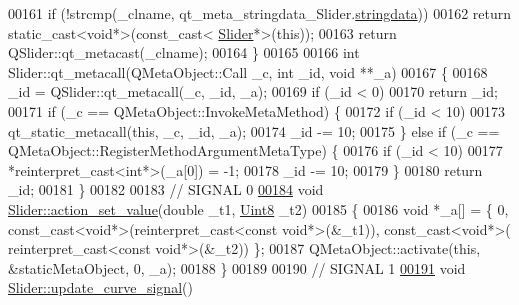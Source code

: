 \begin{DoxyCode}
00161     \textcolor{keywordflow}{if} (!strcmp(\_clname, qt\_meta\_stringdata\_Slider.\hyperlink{a00019_aa9f32a65077d2d4f1c99ac3536a308da}{stringdata}))
00162         \textcolor{keywordflow}{return} \textcolor{keyword}{static\_cast<}\textcolor{keywordtype}{void}*\textcolor{keyword}{>}(\textcolor{keyword}{const\_cast<} \hyperlink{a00024}{Slider}*\textcolor{keyword}{>}(\textcolor{keyword}{this}));
00163     \textcolor{keywordflow}{return} QSlider::qt\_metacast(\_clname);
00164 \}
00165 
00166 \textcolor{keywordtype}{int} Slider::qt\_metacall(QMetaObject::Call \_c, \textcolor{keywordtype}{int} \_id, \textcolor{keywordtype}{void} **\_a)
00167 \{
00168     \_id = QSlider::qt\_metacall(\_c, \_id, \_a);
00169     \textcolor{keywordflow}{if} (\_id < 0)
00170         \textcolor{keywordflow}{return} \_id;
00171     \textcolor{keywordflow}{if} (\_c == QMetaObject::InvokeMetaMethod) \{
00172         \textcolor{keywordflow}{if} (\_id < 10)
00173             qt\_static\_metacall(\textcolor{keyword}{this}, \_c, \_id, \_a);
00174         \_id -= 10;
00175     \} \textcolor{keywordflow}{else} \textcolor{keywordflow}{if} (\_c == QMetaObject::RegisterMethodArgumentMetaType) \{
00176         \textcolor{keywordflow}{if} (\_id < 10)
00177             *\textcolor{keyword}{reinterpret\_cast<}\textcolor{keywordtype}{int}*\textcolor{keyword}{>}(\_a[0]) = -1;
00178         \_id -= 10;
00179     \}
00180     \textcolor{keywordflow}{return} \_id;
00181 \}
00182 
00183 \textcolor{comment}{// SIGNAL 0}
\hypertarget{a00019_source_l00184}{}\hyperlink{a00024_a886f07f2c612121bec703581f9398a10}{00184} \textcolor{keywordtype}{void} \hyperlink{a00024_a886f07f2c612121bec703581f9398a10}{Slider::action\_set\_value}(\textcolor{keywordtype}{double} \_t1, \hyperlink{a00001_a979e3e23b9a449e69ab6a8a83b6042f8}{Uint8} \_t2)
00185 \{
00186     \textcolor{keywordtype}{void} *\_a[] = \{ 0, \textcolor{keyword}{const\_cast<}\textcolor{keywordtype}{void}*\textcolor{keyword}{>}(\textcolor{keyword}{reinterpret\_cast<}\textcolor{keyword}{const }\textcolor{keywordtype}{void}*\textcolor{keyword}{>}(&\_t1)), \textcolor{keyword}{const\_cast<}\textcolor{keywordtype}{void}*\textcolor{keyword}{>}(\textcolor{keyword}{
      reinterpret\_cast<}\textcolor{keyword}{const }\textcolor{keywordtype}{void}*\textcolor{keyword}{>}(&\_t2)) \};
00187     QMetaObject::activate(\textcolor{keyword}{this}, &staticMetaObject, 0, \_a);
00188 \}
00189 
00190 \textcolor{comment}{// SIGNAL 1}
\hypertarget{a00019_source_l00191}{}\hyperlink{a00024_a49696761b5c638a3b2d58b16af9773e0}{00191} \textcolor{keywordtype}{void} \hyperlink{a00024_a49696761b5c638a3b2d58b16af9773e0}{Slider::update\_curve\_signal}()

\end{DoxyCode}

